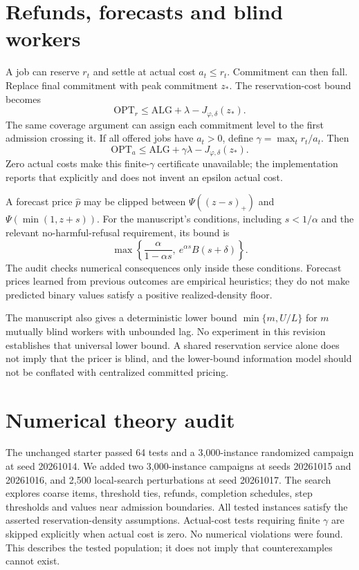 \documentclass[11pt]{article}
\newcommand{\ALG}{\mathrm{ALG}}\newcommand{\OPT}{\mathrm{OPT}}
\begin{document}
\section{Refunds, forecasts and blind workers}
A job can reserve $r_t$ and settle at actual cost $a_t\le r_t$. Commitment can then fall. Replace final commitment with peak commitment $z_*$. The reservation-cost bound becomes
\[\OPT_r\le\ALG+\lambda-J_{\varphi,\delta}(z_*).\]
The same coverage argument can assign each commitment level to the first admission crossing it. If all offered jobs have $a_t>0$, define $\gamma=\max_t r_t/a_t$. Then
\[\OPT_a\le\ALG+\gamma\lambda-J_{\varphi,\delta}(z_*).\]
Zero actual costs make this finite-$\gamma$ certificate unavailable; the implementation reports that explicitly and does not invent an epsilon actual cost.

A forecast price $\widehat p$ may be clipped between $\Psi((z-s)_+)$ and $\Psi(\min(1,z+s))$. For the manuscript's conditions, including $s<1/\alpha$ and the relevant no-harmful-refusal requirement, its bound is
\[\max\left\{\frac{\alpha}{1-\alpha s},\ e^{\alpha s}B(s+\delta)\right\}.\]
The audit checks numerical consequences only inside these conditions. Forecast prices learned from previous outcomes are empirical heuristics; they do not make predicted binary values satisfy a positive realized-density floor.

The manuscript also gives a deterministic lower bound $\min\{m,U/L\}$ for $m$ mutually blind workers with unbounded lag. No experiment in this revision establishes that universal lower bound. A shared reservation service alone does not imply that the pricer is blind, and the lower-bound information model should not be conflated with centralized committed pricing.

\section{Numerical theory audit}
The unchanged starter passed 64 tests and a 3,000-instance randomized campaign at seed 20261014. We added two 3,000-instance campaigns at seeds 20261015 and 20261016, and 2,500 local-search perturbations at seed 20261017. The search explores coarse items, threshold ties, refunds, completion schedules, step thresholds and values near admission boundaries. All tested instances satisfy the asserted reservation-density assumptions. Actual-cost tests requiring finite $\gamma$ are skipped explicitly when actual cost is zero. No numerical violations were found. This describes the tested population; it does not imply that counterexamples cannot exist.
\end{document}
